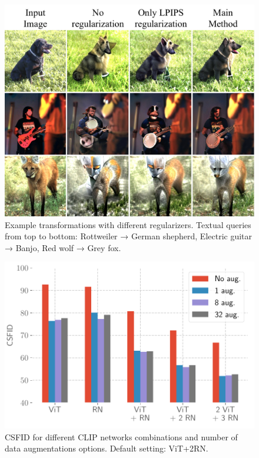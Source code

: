 \begin{figure}[h!]
    \centering
    \vspace{-1em}
    \includegraphics[width=\linewidth]{images/flexit/assets/demo_reg2.pdf}
    \caption{Example transformations with different regularizers. Textual queries from top to bottom: Rottweiler → German shepherd, Electric guitar → Banjo, Red wolf → Grey fox.
    }
\label{fig:demo_reg}
\end{figure}


\begin{figure}[h!]
    \centering
    \vspace{-1em}
    \includegraphics[width=.9\linewidth]{images/flexit/assets/naug_nnets.pdf}
    \caption{CSFID for different CLIP networks combinations and number of data augmentations options. Default setting: ViT+2RN.}
\label{fig:augs}
\end{figure}


